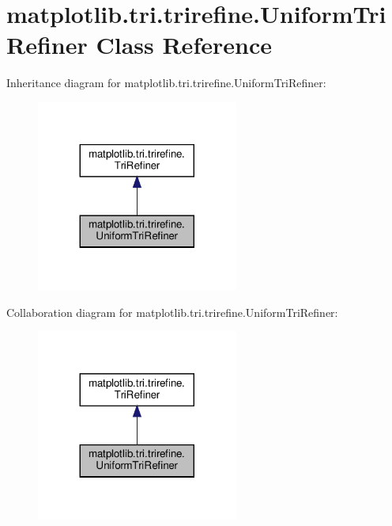 \hypertarget{classmatplotlib_1_1tri_1_1trirefine_1_1UniformTriRefiner}{}\section{matplotlib.\+tri.\+trirefine.\+Uniform\+Tri\+Refiner Class Reference}
\label{classmatplotlib_1_1tri_1_1trirefine_1_1UniformTriRefiner}


Inheritance diagram for matplotlib.\+tri.\+trirefine.\+Uniform\+Tri\+Refiner\+:
\nopagebreak
\begin{figure}[H]
\begin{center}
\leavevmode
\includegraphics[width=188pt]{classmatplotlib_1_1tri_1_1trirefine_1_1UniformTriRefiner__inherit__graph}
\end{center}
\end{figure}


Collaboration diagram for matplotlib.\+tri.\+trirefine.\+Uniform\+Tri\+Refiner\+:
\nopagebreak
\begin{figure}[H]
\begin{center}
\leavevmode
\includegraphics[width=188pt]{classmatplotlib_1_1tri_1_1trirefine_1_1UniformTriRefiner__coll__graph}
\end{center}
\end{figure}
